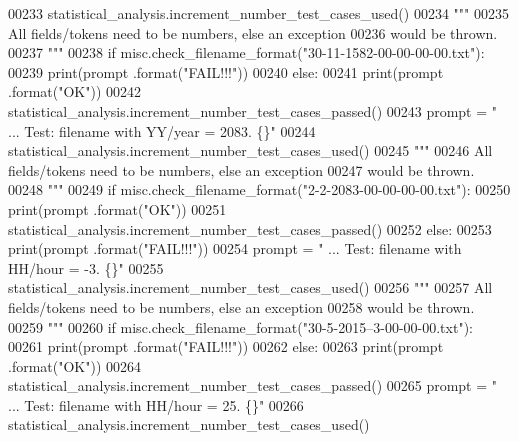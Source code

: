 \begin{DoxyCode}
00233         statistical\_analysis.increment\_number\_test\_cases\_used()
00234         \textcolor{stringliteral}{"""}
00235 \textcolor{stringliteral}{            All fields/tokens need to be numbers, else an exception}
00236 \textcolor{stringliteral}{                would be thrown.}
00237 \textcolor{stringliteral}{        """}
00238         \textcolor{keywordflow}{if} misc.check\_filename\_format(\textcolor{stringliteral}{"30-11-1582-00-00-00-00.txt"}):
00239             print(prompt .format(\textcolor{stringliteral}{"FAIL!!!"}))
00240         \textcolor{keywordflow}{else}:
00241             print(prompt .format(\textcolor{stringliteral}{"OK"}))
00242             statistical\_analysis.increment\_number\_test\_cases\_passed()
00243         prompt = \textcolor{stringliteral}{"  ... Test: filename with YY/year = 2083.         \{\}"}
00244         statistical\_analysis.increment\_number\_test\_cases\_used()
00245         \textcolor{stringliteral}{"""}
00246 \textcolor{stringliteral}{            All fields/tokens need to be numbers, else an exception}
00247 \textcolor{stringliteral}{                would be thrown.}
00248 \textcolor{stringliteral}{        """}
00249         \textcolor{keywordflow}{if} misc.check\_filename\_format(\textcolor{stringliteral}{"2-2-2083-00-00-00-00.txt"}):
00250             print(prompt .format(\textcolor{stringliteral}{"OK"}))
00251             statistical\_analysis.increment\_number\_test\_cases\_passed()
00252         \textcolor{keywordflow}{else}:
00253             print(prompt .format(\textcolor{stringliteral}{"FAIL!!!"}))
00254         prompt = \textcolor{stringliteral}{"  ... Test: filename with HH/hour = -3.           \{\}"}
00255         statistical\_analysis.increment\_number\_test\_cases\_used()
00256         \textcolor{stringliteral}{"""}
00257 \textcolor{stringliteral}{            All fields/tokens need to be numbers, else an exception}
00258 \textcolor{stringliteral}{                would be thrown.}
00259 \textcolor{stringliteral}{        """}
00260         \textcolor{keywordflow}{if} misc.check\_filename\_format(\textcolor{stringliteral}{"30-5-2015--3-00-00-00.txt"}):
00261             print(prompt .format(\textcolor{stringliteral}{"FAIL!!!"}))
00262         \textcolor{keywordflow}{else}:
00263             print(prompt .format(\textcolor{stringliteral}{"OK"}))
00264             statistical\_analysis.increment\_number\_test\_cases\_passed()
00265         prompt = \textcolor{stringliteral}{"  ... Test: filename with HH/hour = 25.           \{\}"}
00266         statistical\_analysis.increment\_number\_test\_cases\_used()

\end{DoxyCode}
